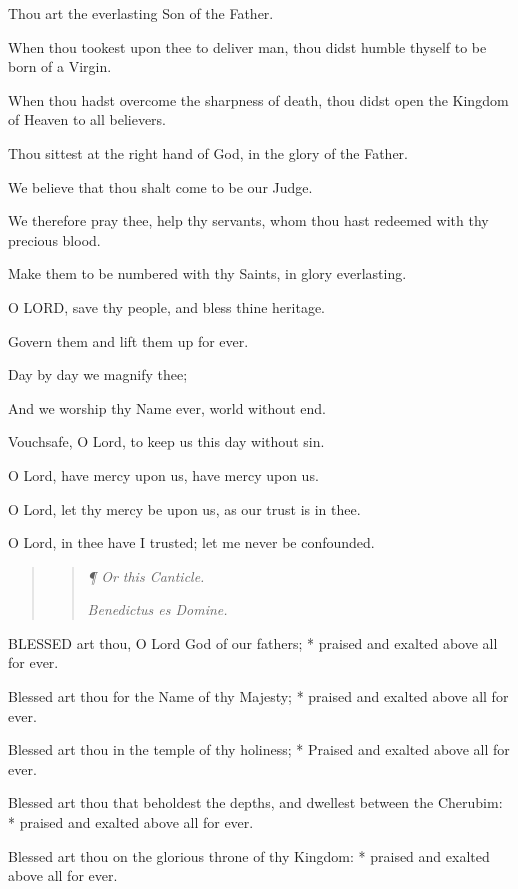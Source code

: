 Thou art the everlasting Son of the Father.

When thou tookest upon thee to deliver man, thou didst
humble thyself to be born of a Virgin.

When thou hadst overcome the sharpness of death, thou
didst open the Kingdom of Heaven to all believers.

Thou sittest at the right hand of God, in the glory
of the Father.

We believe that thou shalt come to be our Judge.

We therefore pray thee, help thy servants, whom thou
hast redeemed with thy precious blood.

Make them to be numbered with thy Saints, in glory
everlasting.

O
LORD, save thy people, and bless thine heritage. 

Govern them and lift them up for ever.

Day by day we magnify thee;

And we worship thy Name ever, world without end.

Vouchsafe, O Lord, to keep us this day without sin.

O Lord, have mercy upon us, have mercy upon us.

O Lord, let thy mercy be upon us, as our trust is in
thee.

O Lord, in thee have I trusted; let me never be confounded.

\begin{quote}

\begin{quote}

\emph{¶
Or this Canticle.}

\emph{Benedictus
es Domine.}

\end{quote}

\end{quote}

BLESSED
art thou, O Lord God of our fathers; * praised and exalted above all for
ever.

Blessed art thou for the Name of thy Majesty; * praised
and exalted above all for ever.

Blessed art thou in the temple of thy holiness; * Praised
and exalted above all for ever.

Blessed art thou that beholdest the depths, and dwellest
between the Cherubim: * praised and exalted above all for ever.

Blessed art thou on the glorious throne of thy Kingdom:
* praised and exalted above all for ever.


